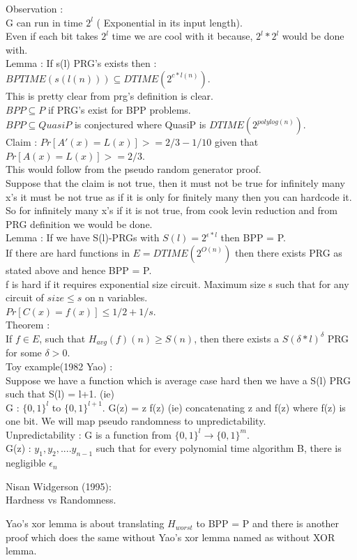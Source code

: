 \documentclass[solution,addpoints,12pt]{exam}
\begin{document}
Observation :\\
G can run in time $2^l$ ( Exponential in its input length).\\
Even if each bit takes $2^l$ time we are cool with it because,
$2^l*2^l$ would be done with.\\

Lemma : If s(l) PRG's exists then :\\
$BPTIME(s(l(n))) \subseteq DTIME(2^{c*l(n)})$.\\
This is pretty clear from prg's definition is clear.\\
$BPP \subseteq P$ if PRG's exist for BPP problems.\\

$BPP \subseteq QuasiP$ is conjectured where QuasiP is
$DTIME(2^{polylog(n)})$.\\

Claim : $Pr[A'(x) = L(x)] >= 2/3 - 1/10$ given that
$Pr[A(x) = L(x)] >= 2/3$.\\ This would follow from the pseudo
random generator proof.\\ Suppose that the claim is not true,
then it must not be true for infinitely many x's it must be not true
as if it is only for finitely many then you can hardcode
it. So for infinitely many x's if it is not true, from cook levin
reduction and from PRG definition we would be done.\\

Lemma : If we have S(l)-PRGs with $S(l) = 2^{\epsilon*l}$ then
BPP = P.\\

If there are hard functions in $E = DTIME(2^{O(n)})$ then
there exists PRG as stated above and hence BPP = P.\\

f is hard if it requires exponential size circuit. Maximum size s
such that for any circuit of $size \le s$ on n variables.\\
$Pr[C(x) = f(x)] \le 1/2 + 1/s$.\\

Theorem :\\
If $f \in E$, such that $H_{avg}(f)(n) \ge S(n)$,
then there exists a $S(\delta*l)^{\delta}$ PRG for some $\delta > 0$.\\

Toy example(1982 Yao) :\\
Suppose we have a function which is average case hard then we have a
S(l) PRG such that S(l) = l+1. (ie)\\
G : ${\{ 0, 1 \}}^l$ to ${\{0, 1\}}^{l+1}$.
G(z) = z f(z)  (ie) concatenating z and f(z) where f(z) is one bit.
We will map pseudo randomness to unpredictability.\\
Unpredictability : G is a function from
${\{0, 1\}}^l \rightarrow {\{0, 1\}}^m$.\\
G(z) : $y_1, y_2, .... y_{n-1}$ such that for every
polynomial time algorithm B, there is negligible $\epsilon_n$


Nisan Widgerson (1995):\\
Hardness vs Randomness.

Yao's xor lemma is about translating $H_{worst}$ to BPP = P
and there is another proof which does the same without Yao's
xor lemma named as without XOR lemma.
\end{document}

